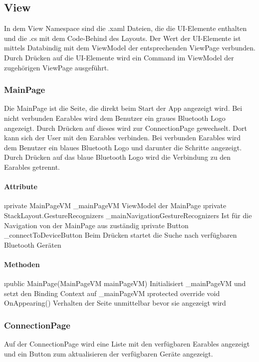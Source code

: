 \documentclass[../entwurf.tex]{subfiles}
\begin{document}
\subsection{View}
In dem View Namespace sind die .xaml Dateien, die die UI-Elemente enthalten und die .cs mit dem Code-Behind des Layouts. Der Wert der UI-Elemente ist mittels Databindig mit dem ViewModel der entsprechenden ViewPage verbunden. Durch Drücken auf die UI-Elemente wird ein Command im ViewModel der zugehörigen ViewPage ausgeführt. 
\subsubsection{MainPage}
Die MainPage ist die Seite, die direkt beim Start der App angezeigt wird. Bei nicht verbunden Earables wird dem Benutzer ein graues Bluetooth Logo angezeigt. Durch Drücken auf dieses wird zur ConnectionPage gewechselt. Dort kann sich der User mit den Earables verbinden. Bei verbunden Earables wird dem Benutzer ein blaues Bluetooth Logo und darunter die Schritte angezeigt. Durch Drücken auf das blaue Bluetooth Logo wird die Verbindung zu den Earables getrennt. 
\paragraph{Attribute}

\begin{itemize}
	\i{private MainPageVM \_mainPageVM} ViewModel der MainPage
	\i{private StackLayout.GestureRecognizers \_mainNavigationGestureRecognizers} Ist für die Navigation von der MainPage aus zuständig
	\i{private Button \_connectToDeviceButton} Beim Drücken startet die Suche nach verfügbaren Bluetooth Geräten
\end{itemize}
\paragraph{Methoden}
\begin{itemize}
	\i{public MainPage(MainPageVM mainPageVM)} Initialisiert \_mainPageVM und setzt den Binding Context 			auf \_mainPageVM
	\i{protected override void OnAppearing()} Verhalten der Seite unmittelbar bevor sie angezeigt wird
\end{itemize}

\subsubsection{ConnectionPage}
Auf der ConnectionPage wird eine Liste mit den verfügbaren Earables angezeigt und ein Button zum aktualisieren der verfügbaren Geräte angezeigt. 
\end{document}

